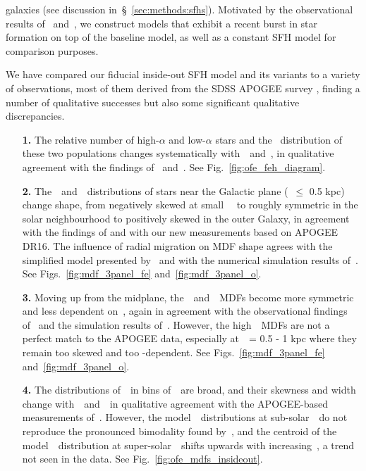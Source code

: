 \documentclass[draft2.tex]{subfiles}
\begin{document}
galaxies (see discussion in~\S~\ref{sec:methods:sfhs}). 
Motivated by the observational results of~\citet{Mor2019} and~\citet{Isern2019}, 
we construct models that exhibit a recent burst in star formation on top of the 
baseline model, as well as a constant SFH model for comparison purposes. 
\par 
We have compared our fiducial inside-out SFH model and its variants to a 
variety of observations, most of them derived from the SDSS APOGEE survey 
\citep{Majewski2017}, finding a number of qualitative successes but also some 
significant qualitative discrepancies. 
\begin{enumerate} 

	\item[\textbf{1.}] The relative number of high-$\alpha$ and low-$\alpha$ 
	stars and the \feh~distribution of these two populations changes 
	systematically with~\rgal~and~\absz, in qualitative agreement with the 
	findings of~\citet{Nidever2014} and~\citet{Hayden2015}. 
	See Fig.~\ref{fig:ofe_feh_diagram}. 

	\item[\textbf{2.}] The~\feh~and~\oh~distributions of stars near the 
	Galactic plane (\absz~$\leq$ 0.5 kpc) change shape, from negatively skewed 
	at small~\rgal~ to roughly symmetric in the solar neighbourhood to 
	positively skewed in the outer Galaxy, in agreement with the findings of 
	\citet{Hayden2015} and with our new measurements based on APOGEE DR16. 
	The influence of radial migration on MDF shape agrees with the simplified 
	model presented by~\citet{Hayden2015} and with the numerical simulation 
	results of~\citet{Loebman2016}. 
	See Figs.~\ref{fig:mdf_3panel_fe} and~\ref{fig:mdf_3panel_o}. 

	\item[\textbf{3.}] Moving up from the midplane, the~\feh~and~\oh~MDFs 
	become more symmetric and less dependent on~\rgal, again in agreement with 
	the observational findings of~\citet{Hayden2015} and the simulation results 
	of~\citet{Loebman2016}. 
	However, the high~\absz~MDFs are not a perfect match to the APOGEE data, 
	especially at~\absz~= 0.5 - 1 kpc where they remain too skewed and too
	\rgal-dependent. 
	See Figs.~\ref{fig:mdf_3panel_fe} and~\ref{fig:mdf_3panel_o}. 

	\item[\textbf{4.}] The distributions of~\ofe~in bins of~\feh~are broad, and 
	their skewness and width change with~\rgal~and~\absz~in qualitative 
	agreement with the APOGEE-based measurements of~\citet{Vincenzo2021a}. 
	However, the model~\ofe~distributions at sub-solar~\feh~do not reproduce 
	the pronounced bimodality found by~\citet{Vincenzo2021a}, and the 
	centroid of the model~\ofe~distribution at super-solar~\feh~shifts upwards 
	with increasing~\absz, a trend not seen in the data. 
	See Fig.~\ref{fig:ofe_mdfs_insideout}. 


\end{enumerate}
\end{document}
